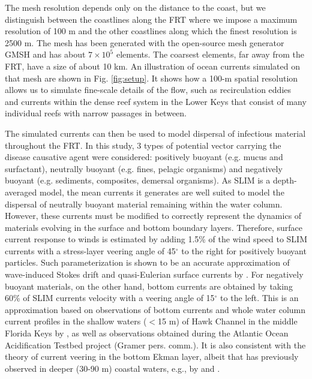 \documentclass[utf8]{frontiersSCNS}
\begin{document}
The mesh resolution depends only on the distance to the coast, but we distinguish between the coastlines along the FRT where we impose a maximum resolution of 100 m and the other coastlines along which the finest resolution is 2500 m. The mesh has been generated with the open-source mesh generator GMSH \citep{Geuzaine2009} and has about $7 \times 10^5$ elements. The coarsest elements, far away from the FRT, have a size of about 10 km. An illustration of ocean currents simulated on that mesh are shown in Fig. \ref{fig:setup}. It shows how a 100-m spatial resolution allows us to simulate fine-scale details of the flow, such as recirculation eddies and currents within the dense reef system in the Lower Keys that consist of many individual reefs with narrow passages in between. 

The simulated currents can then be used to model dispersal of infectious material throughout the FRT. In this study, 3 types of potential vector carrying the disease causative agent were considered: positively buoyant (e.g. mucus and surfactant), neutrally buoyant (e.g. fines, pelagic organisms) and negatively buoyant (e.g. sediments, composites, demersal organisms). As SLIM is a depth-averaged model, the mean currents it generates are well suited to model the dispersal of neutrally buoyant material remaining within the water column. However, these currents must be modified to correctly represent the dynamics of materials evolving in the surface and bottom boundary layers. Therefore, surface current response to winds is estimated by adding 1.5\% of the wind speed to SLIM currents with a stress-layer veering angle of 45$^\circ$ to the right for positively buoyant particles. Such parameterization is shown to be an accurate approximation of wave-induced Stokes drift and quasi-Eulerian surface currents by \citep{ardhuin2009observation}. For negatively buoyant materials, on the other hand, bottom currents are obtained by taking 60\% of SLIM currents velocity with a veering angle of 15$^\circ$ to the left. This is an approximation based on observations of bottom currents and whole water column current profiles in the shallow waters ($<$15 m) of Hawk Channel in the middle Florida Keys by \cite{smith2009influence}, as well as observations obtained during the Atlantic Ocean Acidification Testbed project (Gramer pers. comm.). It is also consistent with the theory of current veering in the bottom Ekman layer, albeit that has previously observed in deeper (30-90 m) coastal waters, e.g., by \cite{perlin2007organization} and \cite{kundu1976ekman}.
\end{document}
